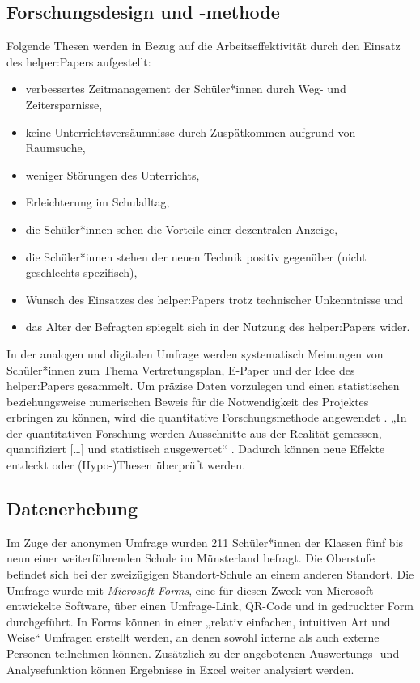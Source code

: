 \documentclass[10pt]{article}
\begin{document}
\subsection{Forschungsdesign und -methode} \label{Forschungsdesign und -methode}
Folgende Thesen werden in Bezug auf die Arbeitseffektivität durch den Einsatz des helper:Papers aufgestellt:
\begin{itemize}
    \setlength\itemsep{0em}
    \item verbessertes Zeitmanagement der Schüler*innen durch Weg- und Zeitersparnisse,
    \item keine Unterrichtsversäumnisse durch Zuspätkommen aufgrund von Raumsuche,
    \item weniger Störungen des Unterrichts,
    \item Erleichterung im Schulalltag, 
    \item die Schüler*innen sehen die Vorteile einer dezentralen Anzeige,
    \item die Schüler*innen stehen der neuen Technik positiv gegenüber (nicht geschlechts-spezifisch),
    \item Wunsch des Einsatzes des helper:Papers trotz technischer Unkenntnisse und
    \item das Alter der Befragten spiegelt sich in der Nutzung des helper:Papers wider. 
\end{itemize}
In der analogen und digitalen Umfrage werden systematisch Meinungen von Schüler*innen zum Thema Vertretungsplan, E-Paper und der Idee des helper:Papers gesammelt. 
Um präzise Daten vorzulegen und einen statistischen beziehungsweise numerischen Beweis für die Notwendigkeit des Projektes erbringen zu können, wird die quantitative Forschungsmethode angewendet \cite{Quantitative_Forschung}.
„In der quantitativen Forschung werden Ausschnitte aus der Realität gemessen, quantifiziert […] und statistisch ausgewertet“ \cite{Quantitative_Forschungsmethode_Definition}. Dadurch können neue Effekte entdeckt oder (Hypo-)Thesen überprüft werden.

\subsection{Datenerhebung}
Im Zuge der anonymen Umfrage wurden 211 Schüler*innen der Klassen fünf bis neun einer weiterführenden Schule im Münsterland befragt. Die Oberstufe befindet sich bei der zweizügigen Standort-Schule an einem anderen Standort.
Die Umfrage wurde mit \textit{Microsoft Forms}, eine für diesen Zweck von Microsoft entwickelte Software,  über einen Umfrage-Link, QR-Code und in gedruckter Form durchgeführt. In Forms können in einer „relativ einfachen, intuitiven Art und Weise“ \cite{Vorteile_Microsoft_Forms} Umfragen erstellt werden, an denen sowohl interne als auch externe Personen teilnehmen können. Zusätzlich zu der angebotenen Auswertungs- und Analysefunktion können Ergebnisse in Excel weiter analysiert werden. 
\end{document}
